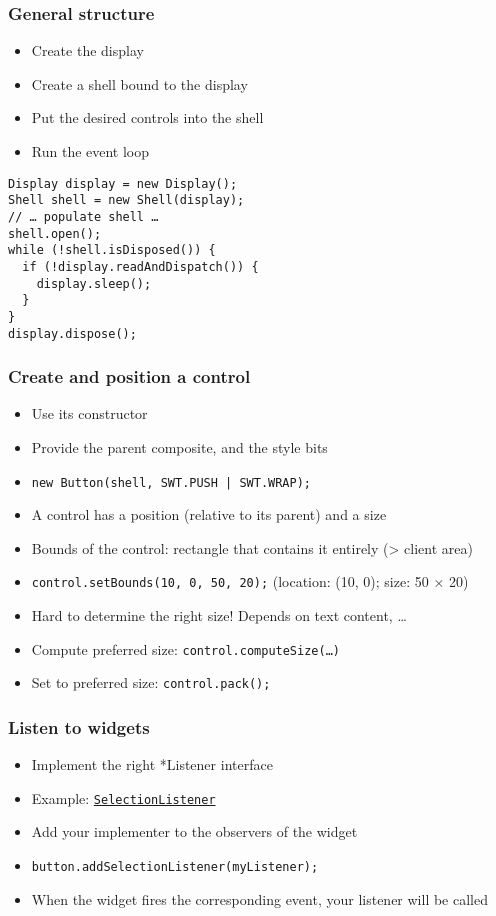\documentclass[french, english]{beamer}
\begin{document}
\begin{frame}[fragile]
	\frametitle{General structure}
	\begin{itemize}
		\item Create the display
		\item Create a shell bound to the display
		\item Put the desired controls into the shell
		\item Run the event loop
	\end{itemize}
	\begin{lstlisting}
Display display = new Display();
Shell shell = new Shell(display);
// … populate shell …
shell.open();
while (!shell.isDisposed()) {
  if (!display.readAndDispatch()) {
    display.sleep();
  }
}
display.dispose();
	\end{lstlisting}
\end{frame}

\begin{frame}
	\frametitle{Create and position a control}
	\begin{itemize}
		\item Use its constructor
		\item Provide the parent composite, and the style bits
		\item \texttt{new Button(shell, SWT.PUSH | SWT.WRAP);}
		\item A control has a position (relative to its parent) and a size
		\item Bounds of the control: rectangle that contains it entirely (> client area)
		\item \texttt{control.setBounds(10, 0, 50, 20);} (location: (10, 0); size: 50 × 20)
		\item Hard to determine the right size! Depends on text content, …
		\item Compute preferred size: \texttt{control.computeSize(…)}
		\item Set to preferred size: \texttt{control.pack();}
	\end{itemize}
\end{frame}

\begin{frame}
	\frametitle{Listen to widgets}
	\begin{itemize}
		\item Implement the right *Listener interface
		\item Example: \href{http://help.eclipse.org/neon/advanced/content.jsp?topic=/org.eclipse.platform.doc.isv/reference/api/org/eclipse/swt/events/SelectionListener.html}{\texttt{SelectionListener}}
		\item Add your implementer to the observers of the widget
		\item \texttt{button.addSelectionListener(myListener);}
		\item When the widget fires the corresponding event, your listener will be called
	\end{itemize}
\end{frame}
\end{document}

